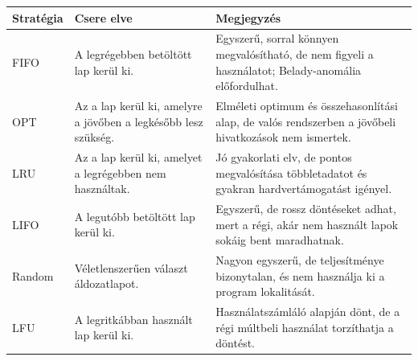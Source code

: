 \begin{tabularx}{\textwidth}{L{23mm}X X}
\toprule
\textbf{Stratégia} & \textbf{Csere elve} & \textbf{Megjegyzés} \\
\midrule
FIFO & A legrégebben betöltött lap kerül ki. & Egyszerű, sorral könnyen megvalósítható, de nem figyeli a használatot; Belady-anomália előfordulhat. \\
OPT & Az a lap kerül ki, amelyre a jövőben a legkésőbb lesz szükség. & Elméleti optimum és összehasonlítási alap, de valós rendszerben a jövőbeli hivatkozások nem ismertek. \\
LRU & Az a lap kerül ki, amelyet a legrégebben nem használtak. & Jó gyakorlati elv, de pontos megvalósítása többletadatot és gyakran hardvertámogatást igényel. \\
LIFO & A legutóbb betöltött lap kerül ki. & Egyszerű, de rossz döntéseket adhat, mert a régi, akár nem használt lapok sokáig bent maradhatnak. \\
Random & Véletlenszerűen választ áldozatlapot. & Nagyon egyszerű, de teljesítménye bizonytalan, és nem használja ki a program lokalitását. \\
LFU & A legritkábban használt lap kerül ki. & Használatszámláló alapján dönt, de a régi múltbeli használat torzíthatja a döntést. \\
\bottomrule
\end{tabularx}
